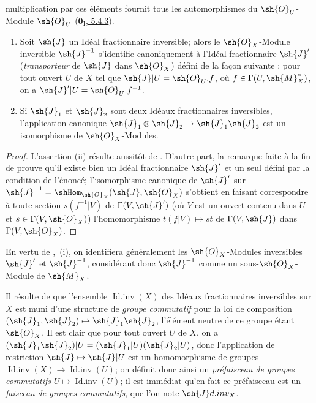 multiplication par ces éléments fournit tous les automorphismes du $\sh{O}_U$-Module $\sh{O}_U$ (\hyperref[0.5.4.3]{$\mathbf{0}_{\mathrm I}$, 5.4.3}).

\begin{corollary}[21.2.3]
\label{IV.21.2.3}
\begin{enumerate}[label=(\roman*)]
  \item Soit $\sh{J}$ un Idéal fractionnaire inversible;
  alors le $\sh{O}_X$-Module inversible $\sh{J}^{-1}$ s'identifie canoniquement à l'Idéal fractionnaire $\sh{J}'$ (\emph{transporteur} de $\sh{J}$ dans $\sh{O}_X$) défini de la façon suivante : pour tout ouvert $U$ de $X$ tel que $\sh{J}|U=\sh{O}_U.f$, où $f\in\Gamma(U,\sh{M}_X^*)$, on a $\sh{J}'|U=\sh{O}_U.f^{-1}$.
  \item Si $\sh{J}_1$ et $\sh{J}_2$ sont deux Idéaux fractionnaires inversibles, l'application canonique $\sh{J}_1\otimes\sh{J}_2\to\sh{J}_1\sh{J}_2$ est un isomorphisme de $\sh{O}_X$-Modules.
\end{enumerate}
\end{corollary}

\begin{proof}
L'assertion (ii) résulte aussitôt de .
D'autre part, la remarque faite à la fin de  prouve qu'il existe bien un Idéal fractionnaire $\sh{J}'$ et un seul défini par la condition de l'énoncé;
l'isomorphisme canonique de $\sh{J}'$ sur $\sh{J}^{-1}=\shHom_{\sh{O}_X}(\sh{J},\sh{O}_X)$ s'obtient en faisant correspondre à toute section $s(f^{-1}|V)$ de $\Gamma(V,\sh{J}')$ (où $V$ est un ouvert contenu dans $U$ et $s\in\Gamma(V,\sh{O}_X)$) l'homomorphisme $t(f|V)\mapsto st$ de $\Gamma(V,\sh{J})$ dans $\Gamma(V,\sh{O}_X)$.
\end{proof}

En vertu de ,~(i), on identifiera généralement les $\sh{O}_X$-Modules inversibles $\sh{J}'$ et $\sh{J}^{-1}$, considérant donc $\sh{J}^{-1}$ comme un sous-$\sh{O}_X$-Module de $\sh{M}_X$.

\begin{env}[21.2.4]
\label{IV.21.2.4}
Il résulte de  que l'ensemble $\operatorname{Id.inv}(X)$ des Idéaux fractionnaires inversibles sur $X$ est muni d'une structure de \emph{groupe commutatif} pour la loi de composition $(\sh{J}_1,\sh{J}_2)\mapsto\sh{J}_1\sh{J}_2$, l'élément neutre de ce groupe étant $\sh{O}_X$.
Il est clair que pour tout ouvert $U$ de $X$, on a $(\sh{J}_1\sh{J}_2)|U=(\sh{J}_1|U)(\sh{J}_2|U)$, donc l'application de restriction $\sh{J}\mapsto\sh{J}|U$ est un homomorphisme de groupes $\operatorname{Id.inv}(X)\to\operatorname{Id.inv}(U)$;
on définit donc ainsi un \emph{préfaisceau de groupes commutatifs} $U\mapsto\operatorname{Id.inv}(U)$;
il est immédiat qu'en fait ce préfaisceau est un \emph{faisceau de groupes commutatifs}, que l'on note $\sh{J}d.inv_X$.
\end{env}

